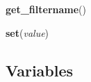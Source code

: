     \vspace{0.5ex}

    \begin{boxedminipage}{\textwidth}

    \raggedright \textbf{get\_filtername}()

    \end{boxedminipage}

    \label{filterII:set}

    \vspace{0.5ex}

    \begin{boxedminipage}{\textwidth}

    \raggedright \textbf{set}(\textit{value})

    \end{boxedminipage}



  \subsection{Variables}

